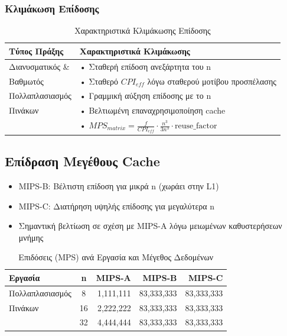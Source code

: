 \documentclass[11pt,a4paper]{article}
\begin{document}
\subsubsection{Κλιμάκωση Επίδοσης}
\begin{table}[h]
\centering
\begin{tabular}{|l|p{11cm}|}
\hline
\textbf{Τύπος Πράξης} & \textbf{Χαρακτηριστικά Κλιμάκωσης} \\
\hline
Διανυσματικός \& & • Σταθερή επίδοση ανεξάρτητα του n \\
Βαθμωτός & • Σταθερό $CPI_{eff}$ λόγω σταθερού μοτίβου προσπέλασης \\
\hline
Πολλαπλασιασμός & • Γραμμική αύξηση επίδοσης με το n \\
Πινάκων & • Βελτιωμένη επαναχρησιμοποίηση cache \\
& • $MPS_{matrix} = \frac{f}{CPI_{eff}} \cdot \frac{n^3}{3n^3} \cdot \text{reuse\_factor}$ \\
\hline
\end{tabular}
\caption{Χαρακτηριστικά Κλιμάκωσης Επίδοσης}
\end{table}

\subsection{Επίδραση Μεγέθους Cache}
\begin{itemize}
    \item MIPS-B: Βέλτιστη επίδοση για μικρά n (χωράει στην L1)
    \item MIPS-C: Διατήρηση υψηλής επίδοσης για μεγαλύτερα n
    \item Σημαντική βελτίωση σε σχέση με MIPS-A λόγω μειωμένων καθυστερήσεων μνήμης
\end{itemize}

\begin{table}[H]
    \centering
    \begin{tabular}{|l|c|r|r|r|}
        \hline
        \textbf{Εργασία} & \textbf{n} & \textbf{MIPS-A} & \textbf{MIPS-B} & \textbf{MIPS-C} \\
        \hline
        Πολλαπλασιασμός & 8 & 1,111,111 & 83,333,333 & 83,333,333 \\
        Πινάκων & 16 & 2,222,222 & 83,333,333 & 83,333,333 \\
        & 32 & 4,444,444 & 83,333,333 & 83,333,333 \\
        \hline
    \end{tabular}
    \caption{Επιδόσεις (MPS) ανά Εργασία και Μέγεθος Δεδομένων}
    \label{tab:performance}
\end{table}
\end{document}

